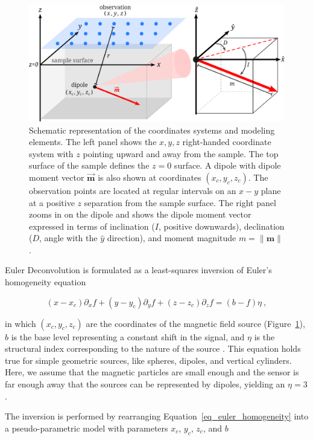 \begin{figure}[tb]
\centering
\includegraphics[width=\linewidth]{figures/coordinate-system-sketch.png}
\caption{
Schematic representation of the coordinates systems and modeling elements.
The left panel shows the $x, y, z$ right-handed coordinate system with $z$
pointing upward and away from the sample. The top surface of the sample defines
the $z=0$ surface. A dipole with dipole moment vector $\mathbf{\vec{m}}$ is
also shown at coordinates $(x_c, y_c, z_c)$. The observation points are located
at regular intervals on an $x-y$ plane at a positive $z$ separation from the
sample surface. The right panel zooms in on the dipole and shows the dipole
moment vector expressed in terms of inclination ($I$, positive downwards),
declination ($D$, angle with the $\hat{y}$ direction), and moment magnitude $m
= \|\mathbf{m}\|$.
}
\label{fig_coordinate_systems}
\end{figure}

Euler Deconvolution is formulated as a least-squares inversion of Euler's
homogeneity equation

\begin{equation}
\label{eq_euler_homogeneity}
(x - x_c)\partial_x f
+ (y - y_c)\partial_y f
+ (z - z_c)\partial_z f
= (b - f)\eta
\ ,
\end{equation}

\noindent
in which $(x_c, y_c, z_c)$ are the coordinates of the magnetic field source (Figure~\ref{fig_coordinate_systems}), $b$ is the base level representing a constant shift in the signal, and $\eta$ is the structural index corresponding to the nature of the source \citep{Reid1990}. This equation holds true for simple geometric sources, like spheres, dipoles, and vertical cylinders. Here, we assume that the magnetic particles are small enough and the sensor is far enough away that the sources can be represented by dipoles, yielding an $\eta=3$.

The inversion is performed by rearranging Equation~\ref{eq_euler_homogeneity} into a pseudo-parametric model with parameters $x_c$, $y_c$, $z_c$, and $b$

